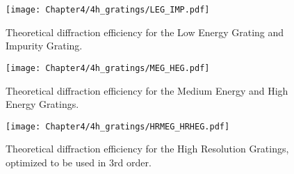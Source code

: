 \begin{figure}[htbp] %
   \centering
   \texttt{[image: Chapter4/4h\_gratings/LEG\_IMP.pdf]} 
   \caption{Theoretical diffraction efficiency for the Low Energy Grating and Impurity Grating.}
   \label{4h-1}
\end{figure}

\begin{figure}[htbp] %
   \centering
   \texttt{[image: Chapter4/4h\_gratings/MEG\_HEG.pdf]} 
   \caption{Theoretical diffraction efficiency for the Medium Energy and High Energy Gratings.}
   \label{4h-2}
\end{figure}

\begin{figure}[htbp] %
   \centering
   \texttt{[image: Chapter4/4h\_gratings/HRMEG\_HRHEG.pdf]} 
   \caption{Theoretical diffraction efficiency for the High Resolution Gratings, optimized to be used in 3rd order.}
   \label{4h-3}
\end{figure}